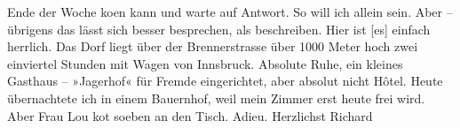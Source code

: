 \begin{ledgroupsized}[t]{13cm}
               Ende der Woche ko{\geminationm}en kann und warte auf Antwort. So will
               ich allein sein. Aber – übrigens das lässt sich besser besprechen, als beschreiben.
               Hier ist {\pb}{[}es{]} einfach herrlich. Das Dorf liegt über der Brennerstrasse über 1000 Meter hoch zwei einviertel Stunden mit
               Wagen von Innsbruck. Absolute Ruhe, ein kleines
               Gasthaus – »Jagerhof« für Fremde eingerichtet,
               aber absolut nicht Hôtel. Heute übernachtete ich in einem Bauernhof, weil mein Zimmer
               erst heute frei wird. Aber Frau Lou ko{\geminationm}t soeben an den Tisch. Adieu.\pend
           \pstart Herzlichst \spacefill\mbox{Richard}\pend{}
         
         \endnumbering{}\end{ledgroupsized}  \newcommand{\dateiname}{L00480}\newcommand{\titel}{Richard Beer-Hofmann an Arthur Schnitzler, 10. 9. 1895}\newcommand{\editorInnen}{Martin Anton Müller und Gerd-Hermann Susen}
      